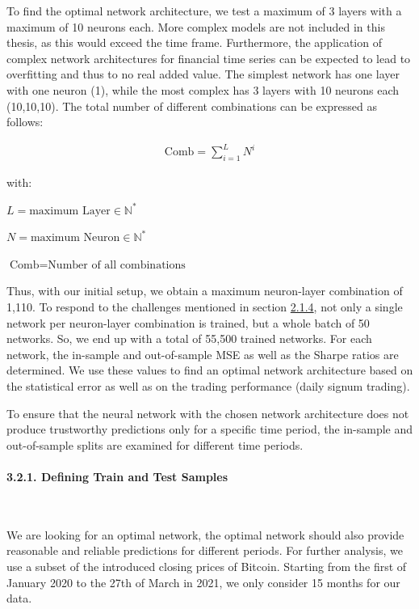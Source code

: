 \documentclass[
]{article}
\begin{document}
To find the optimal network architecture, we test a maximum of 3 layers
with a maximum of 10 neurons each. More complex models are not included
in this thesis, as this would exceed the time frame. Furthermore, the
application of complex network architectures for financial time series
can be expected to lead to overfitting and thus to no real added value.
The simplest network has one layer with one neuron (1), while the most
complex has 3 layers with 10 neurons each (10,10,10). The total number
of different combinations can be expressed as follows:

\begin{align} \label{eq:comb}
\text{Comb}=\sum_{i=1}^{L}N^{i}
\end{align}

with:

\(L=\text{maximum Layer} \in \mathbb{N}^{*}\)

\(N=\text{maximum Neuron}\in \mathbb{N}^{*}\)

\(\text{Comb} =\text{Number of all combinations}\)

Thus, with our initial setup, we obtain a maximum neuron-layer
combination of 1,110. To respond to the challenges mentioned in section
\protect\hyperlink{challenges}{2.1.4}, not only a single network per
neuron-layer combination is trained, but a whole batch of 50 networks.
So, we end up with a total of 55,500 trained networks. For each network,
the in-sample and out-of-sample MSE as well as the Sharpe ratios are
determined. We use these values to find an optimal network architecture
based on the statistical error as well as on the trading performance
(daily signum trading).

To ensure that the neural network with the chosen network architecture
does not produce trustworthy predictions only for a specific time
period, the in-sample and out-of-sample splits are examined for
different time periods.

\newpage

\hypertarget{test_train}{%
\paragraph{3.2.1. Defining Train and Test Samples}\label{test_train}}

~

We are looking for an optimal network, the optimal network should also
provide reasonable and reliable predictions for different periods. For
further analysis, we use a subset of the introduced closing prices of
Bitcoin. Starting from the first of January 2020 to the 27th of March in
2021, we only consider 15 months for our data.
\end{document}
